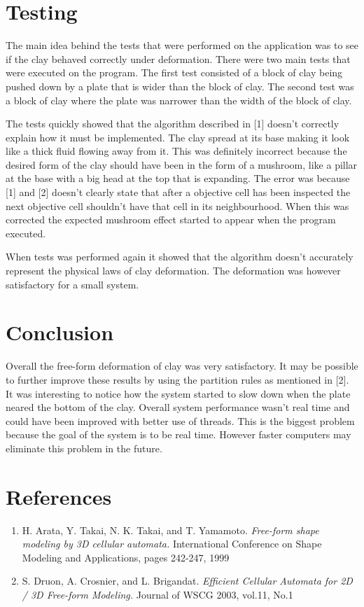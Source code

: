 \documentclass[a4paper,11pt,titlepage]{article}
\begin{document}
\section{Testing}
The main idea behind the tests that were performed on the application was to see if the clay behaved correctly under deformation. There were two main tests that were executed on the program. 
The first test consisted of a block of clay being pushed down by a plate that is wider than the block of clay. The second test was a block of clay where the plate was narrower than the width of the block of clay.

The tests quickly showed that the algorithm described in [1] doesn't correctly explain how it must be implemented.
The clay spread at its base making it look like a thick fluid flowing away from it. This was definitely incorrect because the desired form of the clay should have been in the form of a mushroom, like a pillar at the base with a big head at the top that is expanding. The error was because [1] and [2] doesn't clearly state that after a objective cell has been inspected the next objective cell shouldn't have that cell in its neighbourhood.
When this was corrected the expected mushroom effect started to appear when the program executed.

When tests was performed again it showed that the algorithm doesn't accurately represent the physical laws of clay deformation. The deformation was however satisfactory for a small system.
\newpage
\section{Conclusion}
Overall the free-form deformation of clay was very satisfactory. It may be possible to further improve these results by using the partition rules as mentioned in [2]. It was interesting to notice how the system started to slow down when the plate neared the bottom of the clay. Overall system performance wasn't real time and could have been improved with better use of threads. 
This is the biggest problem because the goal of the system is to be real time. However faster computers may eliminate this problem in the future.
\section{References}
\begin{enumerate}
\item H. Arata, Y. Takai, N. K. Takai, and T. Yamamoto.
\emph{Free-form shape modeling by 3D cellular automata.} International Conference on Shape Modeling and Applications, pages 242-247, 1999
\item S. Druon, A. Crosnier, and L. Brigandat.
\emph{Efficient Cellular Automata for 2D / 3D Free-form Modeling.} Journal of WSCG 2003, vol.11, No.1
\end{enumerate}
\end{document}
